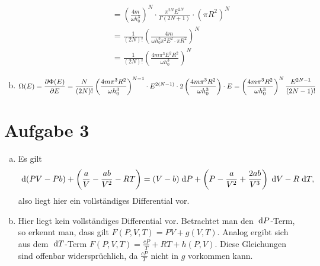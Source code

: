 \documentclass{article}
\theoremstyle{definition}
\begin{document}
\begin{enumerate}[(a)]
\begin{enumerate}[(i)]
\begin{align*}
            &= \left(\frac{4m}{\omega h_0^{3}}\right)^N \cdot \frac{\pi^{2N} E^{2N}}{\Gamma(2N + 1)} \cdot \left(\pi R^2\right)^N\\
            &= \frac{1}{(2N)!} \left(\frac{4m}{\omega h_0^3 \pi^2 E^2\cdot \pi R^2}\right)^N\\
            &= \frac{1}{(2N)!} \left(\frac{4m\pi^3E^2R^2}{\omega h_0^3}\right)^N
        \end{align*}
    \end{enumerate}
    \item \[\Omega(E) = \pdv{\Phi(E)}{E} = \frac{N}{(2N)!} \left(\frac{4m\pi^3R^2}{\omega h_0^3}\right)^{N-1}\cdot E^{2(N-1)} \cdot 2\left(\frac{4m\pi^3R^2}{\omega h_0^3}\right)\cdot E = \left(\frac{4m\pi^3R^2}{\omega h_0^3}\right)^N \frac{E^{2N-1}}{(2N-1)!}\]
\end{enumerate}
\section*{Aufgabe 3}
\begin{enumerate}[(a)]
    \item Es gilt \[\d (PV-Pb) + \left(\frac{a}{V} - \frac{ab}{V^2} - RT\right) = (V-b)\d P + \left(P -\frac{a}{V^2} + \frac{2ab}{V^3}\right)\d V - R \d T,\] also liegt hier ein vollständiges Differential vor.
    \item Hier liegt kein vollständiges Differential vor. Betrachtet man den $\d P$-Term, so erkennt man, dass gilt $F(P,V,T) = PV + g(V,T)$. Analog ergibt sich aus dem $\d T$-Term $F(P,V,T) = \frac{cP}{T} + RT + h(P,V)$. Diese Gleichungen sind offenbar widersprüchlich, da $\frac{cP}{T}$ nicht in $g$ vorkommen kann.
\end{enumerate}
\end{document}

